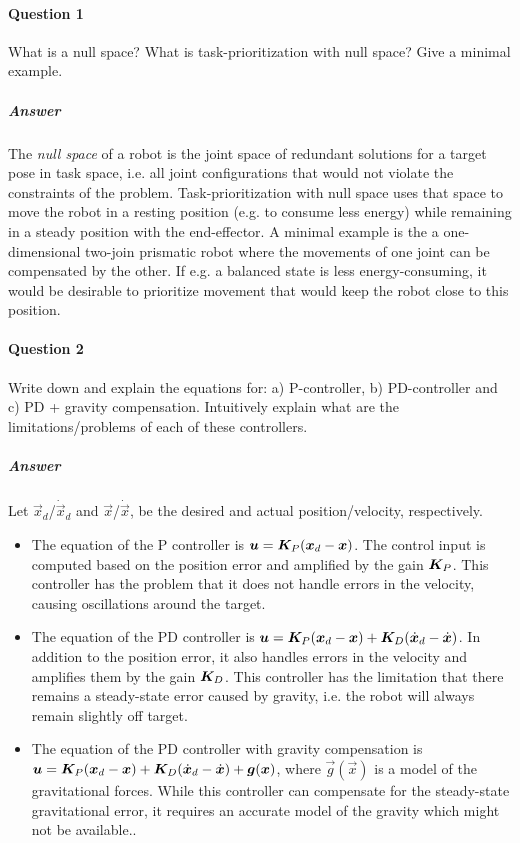	\paragraph{Question 1}
		What is a null space? What is task-prioritization with null space? Give a minimal example.

		\subparagraph{Answer}
			The \emph{null space} of a robot is the joint space of redundant solutions for a target pose in task space, i.e. all joint configurations that would not violate the constraints of the problem. Task-prioritization with null space uses that space to move the robot in a resting position (e.g. to consume less energy) while remaining in a steady position with the end-effector. A minimal example is the a one-dimensional two-join prismatic robot where the movements of one joint can be compensated by the other. If e.g. a balanced state is less energy-consuming, it would be desirable to prioritize movement that would keep the robot close to this position.

	\paragraph{Question 2}
		Write down and explain the equations for: a) P-controller, b) PD-controller and c) PD + gravity compensation. Intuitively explain what are the limitations/problems of each of these controllers.

		\subparagraph{Answer}
			Let \(\vec{x}_d\)/\(\dot{\vec{x}}_d\) and \(\vec{x}\)/\(\dot{\vec{x}}\), be the desired and actual position/velocity, respectively.
			\begin{itemize}
				\item The equation of the P controller is \( \bm{u} = \bm{K}_P (\bm{x}_d - \bm{x}) \). The control input is computed based on the position error and amplified by the gain \(\bm{K}_P\). This controller has the problem that it does not handle errors in the velocity, causing oscillations around the target.
				\item The equation of the PD controller is \( \bm{u} = \bm{K}_P (\bm{x}_d - \bm{x}) + \bm{K}_D (\dot{\bm{x}}_d - \dot{\bm{x}}) \). In addition to the position error, it also handles errors in the velocity and amplifies them by the gain \(\bm{K}_D\). This controller has the limitation that there remains a steady-state error caused by gravity, i.e. the robot will always remain slightly off target.
				\item The equation of the PD controller with gravity compensation is \( \bm{u} = \bm{K}_P (\bm{x}_d - \bm{x}) + \bm{K}_D (\dot{\bm{x}}_d - \dot{\bm{x}}) + \bm{g}(\bm{x}) \), where \(\vec{g}(\vec{x})\) is a model of the gravitational forces. While this controller can compensate for the steady-state gravitational error, it requires an accurate model of the gravity which might not be available..
			\end{itemize}

